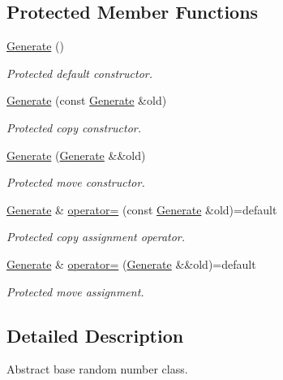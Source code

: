 \subsection*{Protected Member Functions}
\begin{DoxyCompactItemize}
\item 
\mbox{\label{classvarfiles_1_1_generate_ab765be55656fbbe52b3613f0c8ae9bcc}} 
\hyperlink{classvarfiles_1_1_generate_ab765be55656fbbe52b3613f0c8ae9bcc}{Generate} ()
\begin{DoxyCompactList}\small\item\em Protected default constructor. \end{DoxyCompactList}\item 
\hyperlink{classvarfiles_1_1_generate_a43cb2d24eceed4049a01ebfcbe5b66fb}{Generate} (const \hyperlink{classvarfiles_1_1_generate}{Generate} \&old)
\begin{DoxyCompactList}\small\item\em Protected copy constructor. \end{DoxyCompactList}\item 
\hyperlink{classvarfiles_1_1_generate_ac6d367676afc2e1ab4c10dddc792edc0}{Generate} (\hyperlink{classvarfiles_1_1_generate}{Generate} \&\&old)
\begin{DoxyCompactList}\small\item\em Protected move constructor. \end{DoxyCompactList}\item 
\hyperlink{classvarfiles_1_1_generate}{Generate} \& \hyperlink{classvarfiles_1_1_generate_ab43453509b0f73a13b111e11e0dcb498}{operator=} (const \hyperlink{classvarfiles_1_1_generate}{Generate} \&old)=default
\begin{DoxyCompactList}\small\item\em Protected copy assignment operator. \end{DoxyCompactList}\item 
\hyperlink{classvarfiles_1_1_generate}{Generate} \& \hyperlink{classvarfiles_1_1_generate_a6e63f2d9f9570f38d4d67f51a770a0b2}{operator=} (\hyperlink{classvarfiles_1_1_generate}{Generate} \&\&old)=default
\begin{DoxyCompactList}\small\item\em Protected move assignment. \end{DoxyCompactList}\end{DoxyCompactItemize}


\subsection{Detailed Description}
Abstract base random number class. 

